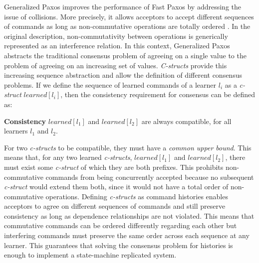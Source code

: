 Generalized Paxos improves the performance of Fast Paxos by addressing the issue of collisions. More precisely, it allows acceptors to accept different sequences of commands as long as non-commutative operations are totally ordered \cite{Lamport2005}.  In the original description, non-commutativity between operations is generically represented as an interference relation. In this context, Generalized Paxos abstracts the traditional consensus problem of agreeing on a single value to the problem of agreeing on an increasing set of values. \textit{C-structs} provide this increasing sequence abstraction and allow the definition of different consensus problems. If we define the sequence of learned commands of a learner $l_i$ as a \textit{c-struct} $learned[l_i]$, then the consistency requirement for consensus can be defined as:\par
\textbf{Consistency} $learned[l_1]$ and $learned[l_2]$ are always compatible, for all learners $l_1$ and $l_2$. \par
For two \textit{c-structs} to be compatible, they must have a \textit{common upper bound}. This means that, for any two learned \textit{c-structs}, $learned[l_1]$ and $learned[l_2]$, there must exist some \textit{c-struct} of which they are both prefixes. This prohibits non-commutative commands from being concurrently accepted because no subsequent \textit{c-struct} would extend them both, since it would not have a total order of non-commutative operations. Defining \textit{c-structs} as command histories enables acceptors to agree on different sequences of commands and still preserve consistency as long as dependence relationships are not violated. This means that commutative commands can be ordered differently regarding each other but interfering commands must preserve the same order across each sequence at any learner. This guarantees that solving the consensus problem for histories is enough to implement a state-machine replicated system. \par

